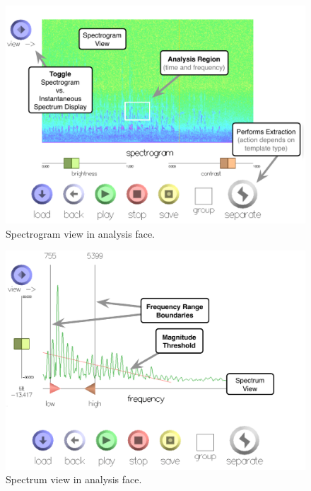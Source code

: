 \documentclass[10pt,letterpaper]{article}
\begin{document}
\begin{figure}[h]
  \begin{center}
    \includegraphics[width=1\columnwidth]{ui_specgram_w.pdf}
    \caption{Spectrogram view in analysis face.} 
    \label{fig:ui_specgram}
  \end{center}
\end{figure}

\begin{figure}[h]
  \begin{center}
    \includegraphics[width=1\columnwidth]{ui_spectrum_w.pdf}
    \caption{Spectrum view in analysis face.} 
    \label{fig:ui_spectrum}
  \end{center}
\end{figure}
\end{document}

